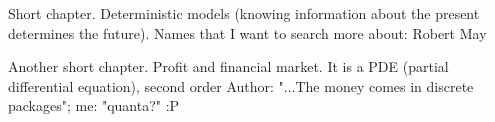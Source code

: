 \documentclass{cornell}
\begin{document}
%
{Short chapter. Deterministic models (knowing information about the present determines the future). }%
{Names that I want to search more about: Robert May}%

%
{Another short chapter. Profit and financial market. It is a PDE (partial differential equation), second order}%
{Author: "...The money comes in discrete packages"; me: "quanta?" :P }%

\end{document}
